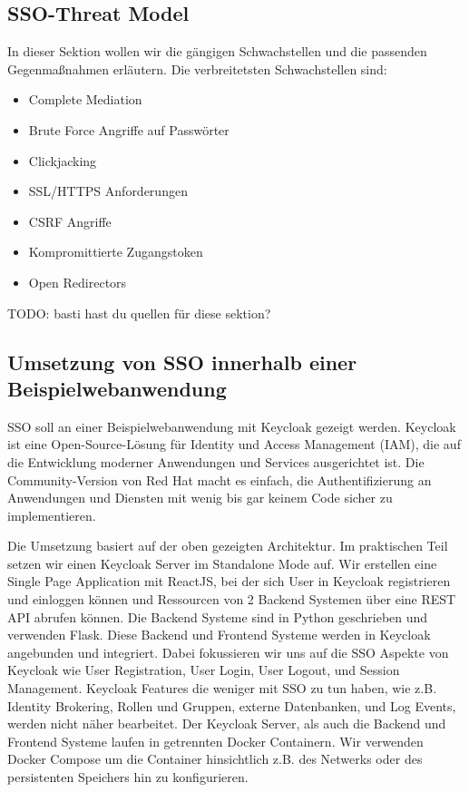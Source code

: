 \documentclass[12pt]{article}
\begin{document}
\subsection{SSO-Threat Model}
	
In dieser Sektion wollen wir die gängigen Schwachstellen und die passenden Gegenmaßnahmen erläutern.
Die verbreitetsten Schwachstellen sind:
	
\begin{itemize}
	\item Complete Mediation
		
	\item Brute Force Angriffe auf Passwörter
		
	\item Clickjacking
	
		
	\item SSL/HTTPS Anforderungen
	
	\item CSRF Angriffe
	
	\item Kompromittierte Zugangstoken
	
	\item Open Redirectors
\end{itemize}

TODO: basti hast du quellen für diese sektion?

\subsection{Umsetzung von SSO innerhalb einer Beispielwebanwendung}
SSO soll an einer Beispielwebanwendung mit Keycloak gezeigt werden. Keycloak ist eine Open-Source-Lösung für Identity und Access Management (IAM), die auf die Entwicklung moderner Anwendungen und Services ausgerichtet ist. Die Community-Version von Red Hat macht es einfach, die Authentifizierung an Anwendungen und Diensten mit wenig bis gar keinem Code sicher zu implementieren. \cite{RFC6819}

Die Umsetzung basiert auf der oben gezeigten Architektur. Im praktischen Teil setzen wir einen Keycloak Server im Standalone Mode auf. Wir erstellen eine Single Page Application mit ReactJS, bei der sich User in Keycloak registrieren und einloggen können und Ressourcen von 2 Backend Systemen über eine REST API abrufen können. Die Backend Systeme sind in Python geschrieben und verwenden Flask. Diese Backend und Frontend Systeme werden in Keycloak angebunden und integriert. Dabei fokussieren wir uns auf die SSO Aspekte von Keycloak wie User Registration, User Login, User Logout, und Session Management. Keycloak Features die weniger mit SSO zu tun haben, wie z.B. Identity Brokering, Rollen und Gruppen, externe Datenbanken, und Log Events, werden nicht näher bearbeitet. Der Keycloak Server, als auch die Backend und Frontend Systeme laufen in getrennten Docker Containern. Wir verwenden Docker Compose um die Container hinsichtlich z.B. des Netwerks oder des persistenten Speichers hin zu konfigurieren.
\end{document}
